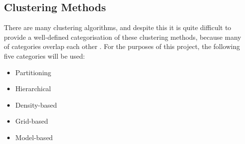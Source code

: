 \subsection{Clustering Methods}
There are many clustering algorithms, and despite this it is quite difficult to 
provide a well-defined categorisation of these clustering methods, because many
of categories overlap each other \citep{everitt74}.
For the purposes of this project, the following five categories will be used:
\begin{itemize}
  \item Partitioning
  \item Hierarchical
  \item Density-based
  \item Grid-based
  \item Model-based
\end{itemize}
